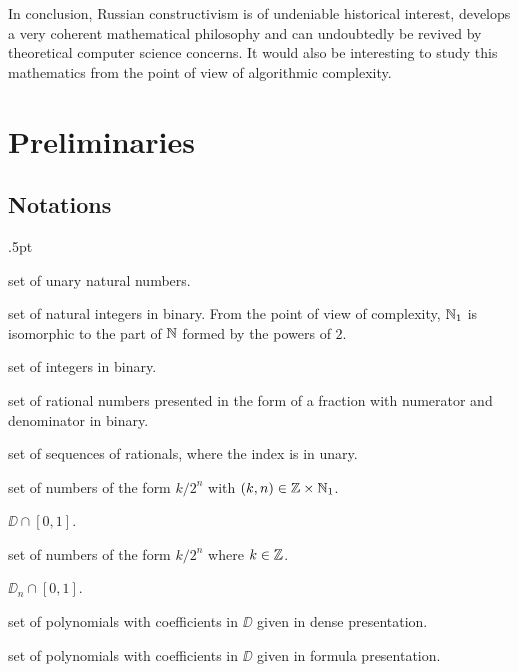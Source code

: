 In conclusion, Russian constructivism is of undeniable historical interest, develops a very coherent mathematical philosophy and can undoubtedly be revived by theoretical computer science concerns. 
It would also be interesting to study this mathematics from the point of view of algorithmic complexity. 

\section{Preliminaries}\label{sec1}
\subsection{Notations}\label{subsec11}
\begin{description}\itemsep.5pt
\item [$\NN_1$] 
set of unary natural numbers.

\item [$\N$]  
set of natural integers in binary. From the point of view of complexity, $\NN_1$ is isomorphic to the part of $\mathbb {N}$ formed by the powers of $2$.

\item [$\ZZ$] 
set of integers in binary.

\item [$\QQ$] 
set of rational numbers presented in the form of a fraction with numerator and denominator in binary.

\item [$\QQ^{\NN_1}$] 
set of sequences of rationals, where the index is in unary.

\item [$\DD$] 
set of numbers of the form $k/2^n$ with $(k,n) \in \mathbb {Z} \times \mathbb {N}_1$.

\item [$\DD_{[0,1]}$] 
$\DD \cap [0,1]$.

\item [$\DD_n$] 
set of numbers of the form $k/2^n $ where $k \in \mathbb {Z}$.

\item [$\DD_{n,[0,1]}$] 
$\DD_n \cap [0,1]$.

\item [${\DD[X]}$] 
set of polynomials with coefficients in $\DD$ given in dense presentation.

\item [${\DD[X]_f}$] 
set of polynomials with coefficients in $\DD$ given in formula presentation.


\end{description}
